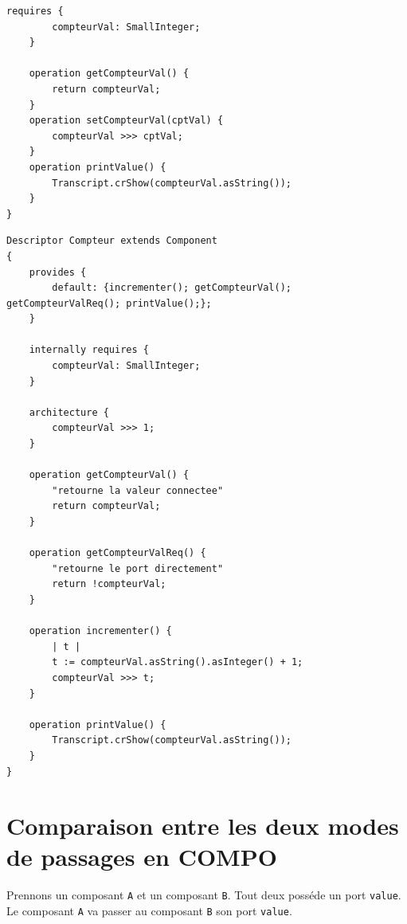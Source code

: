 \documentclass[11pt,a4paper,openany,oneside]{book}
\begin{document}
\begin{appendices}
\begin{lstlisting}[language=Compo, frame=single, caption=Programme Suiveur]
	requires {
		compteurVal: SmallInteger;
	}
	
	operation getCompteurVal() {
		return compteurVal;
	}
	operation setCompteurVal(cptVal) {
		compteurVal >>> cptVal;
	}
	operation printValue() {
	    Transcript.crShow(compteurVal.asString());
	}
}
\end{lstlisting}

\begin{lstlisting}[language=Compo, frame=single, caption=Programme Compteur]
Descriptor Compteur extends Component
{
	provides {
		default: {incrementer(); getCompteurVal(); getCompteurValReq(); printValue();};
	}
	
	internally requires {
		compteurVal: SmallInteger;
	}
	
	architecture {
	    compteurVal >>> 1;
	}
	
	operation getCompteurVal() {
	    "retourne la valeur connectee"
		return compteurVal;
	}
	
	operation getCompteurValReq() {
	    "retourne le port directement"
		return !compteurVal;
	}
	
	operation incrementer() {
	    | t |
	    t := compteurVal.asString().asInteger() + 1;
	    compteurVal >>> t;
	}
	
	operation printValue() {
	    Transcript.crShow(compteurVal.asString());
	}
}
\end{lstlisting}


\chapter{Comparaison entre les deux modes de passages en COMPO}
\label{passagereqprovider}

Prennons un composant \texttt{A} et un composant \texttt{B}. Tout deux posséde un port \texttt{value}. Le composant \texttt{A} va passer au composant \texttt{B} son port \texttt{value}.


\end{appendices}
\end{document}
